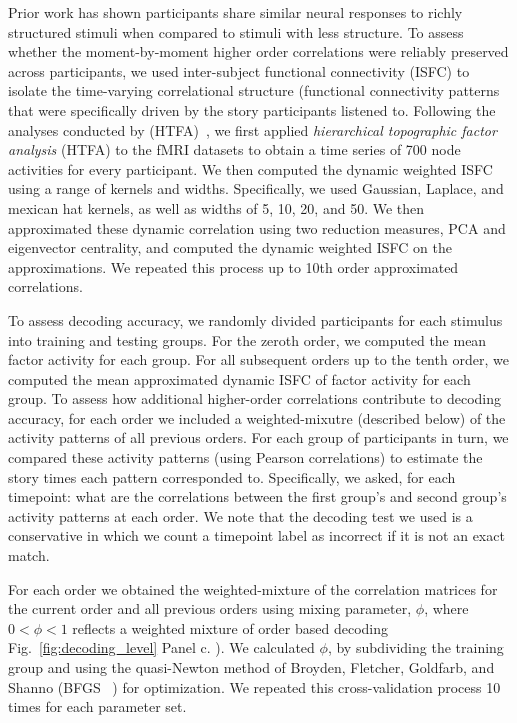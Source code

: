 \documentclass[english]{article}
\begin{document}
Prior work has shown participants share similar neural responses to
richly structured stimuli when compared to stimuli with less
structure.  To assess whether the moment-by-moment higher order
correlations were reliably preserved across participants, we used
inter-subject functional connectivity (ISFC) to isolate the
time-varying correlational structure (functional connectivity patterns
that were specifically driven by the story participants listened to.
Following the analyses conducted by (HTFA)~\cite{MannEtal18}, we first
applied \textit{hierarchical topographic factor analysis} (HTFA) to
the fMRI datasets to obtain a time series of 700 node activities for
every participant.  We then computed the dynamic weighted ISFC using a
range of kernels and widths.  Specifically, we used Gaussian, Laplace,
and mexican hat kernels, as well as widths of 5, 10, 20, and 50.  We
then approximated these dynamic correlation using two reduction measures, PCA and eigenvector centrality, and computed the dynamic weighted ISFC on the approximations.  We repeated this process up to 10th order approximated correlations.  

To assess decoding accuracy, we randomly divided participants for each
stimulus into training and testing groups. For the zeroth order, we
computed the mean factor activity for each group.  For all subsequent
orders up to the tenth order, we computed the mean approximated
dynamic ISFC of factor activity for each group. To assess how
additional higher-order correlations contribute to decoding accuracy,
for each order we included a weighted-mixutre (described below) of the activity patterns of all
previous orders.  For each group of participants in turn, we compared these activity patterns (using Pearson correlations) to estimate the story times each pattern corresponded to. Specifically, we asked, for each timepoint: what are the correlations
between the first group's and second group's activity patterns at each
order. We note that the decoding test we used is a conservative in which we count a timepoint label as incorrect if it is not an exact match.

For each order we obtained the weighted-mixture of the correlation
matrices for the current order and all previous orders using mixing parameter, $\phi$, where $0 <\phi< 1$ reflects a
weighted mixture of order based decoding Fig.~\ref{fig:decoding_level}
Panel c. ). We calculated  $\phi$, by
subdividing the training group and using the quasi-Newton method of
Broyden, Fletcher, Goldfarb, and Shanno (BFGS ~\citep{NoceWrig06}) for optimization. We
repeated this cross-validation process 10 times for each parameter set. 
\end{document}

